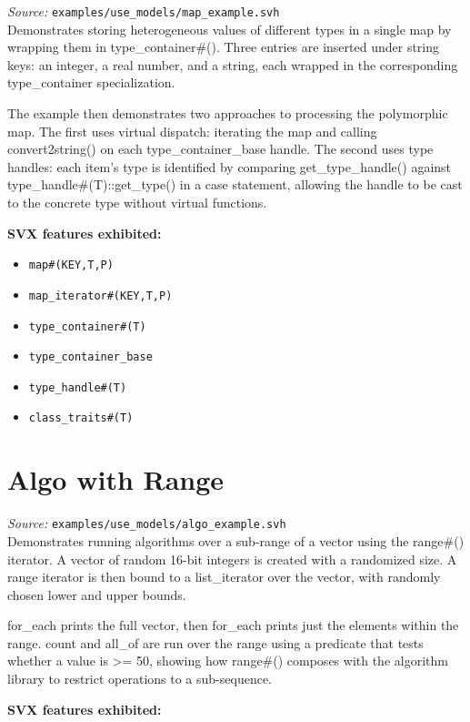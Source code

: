 \documentclass[11pt,letterpaper]{report}
\begin{document}
\textit{Source:} \texttt{examples/use\_models/map\_example.svh}\\

Demonstrates storing heterogeneous values of different types in a single map by wrapping them in type\_container\#(). Three entries are inserted under string keys: an integer, a real number, and a string, each wrapped in the corresponding type\_container specialization.

The example then demonstrates two approaches to processing the polymorphic map. The first uses virtual dispatch: iterating the map and calling convert2string() on each type\_container\_base handle. The second uses type handles: each item's type is identified by comparing get\_type\_handle() against type\_handle\#(T)::get\_type() in a case statement, allowing the handle to be cast to the concrete type without virtual functions.

\textbf{SVX features exhibited:}

\begin{itemize}
  \item \texttt{map\#(KEY,T,P)}
  \item \texttt{map\_iterator\#(KEY,T,P)}
  \item \texttt{type\_container\#(T)}
  \item \texttt{type\_container\_base}
  \item \texttt{type\_handle\#(T)}
  \item \texttt{class\_traits\#(T)}
\end{itemize}
\section{Algo with Range}

\textit{Source:} \texttt{examples/use\_models/algo\_example.svh}\\

Demonstrates running algorithms over a sub-range of a vector using the range\#() iterator. A vector of random 16-bit integers is created with a randomized size. A range iterator is then bound to a list\_iterator over the vector, with randomly chosen lower and upper bounds.

for\_each prints the full vector, then for\_each prints just the elements within the range. count and all\_of are run over the range using a predicate that tests whether a value is >= 50, showing how range\#() composes with the algorithm library to restrict operations to a sub-sequence.

\textbf{SVX features exhibited:}
\end{document}
